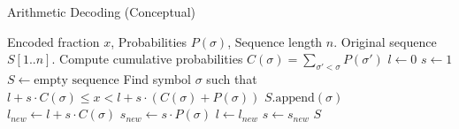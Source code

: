 \begin{algorithm}[hbtp]
    \caption{Arithmetic Decoding (Conceptual)} \label{alg:arithmetic_decoding}
    \begin{algorithmic}[1]
        \Require Encoded fraction $x$, Probabilities $P(\sigma)$, Sequence length $n$.
        \Ensure Original sequence $S[1..n]$.
        \State Compute cumulative probabilities $C(\sigma) = \sum_{\sigma' < \sigma} P(\sigma')$
        \State $l \gets 0$
        \State $s \gets 1$
        \State $S \gets \text{empty sequence}$
        \State Find symbol $\sigma$ such that $l+s \cdot C(\sigma) \le x < l+s \cdot (C(\sigma)+P(\sigma))$
        \State $S.\text{append}(\sigma)$
        \State $l_{new} \gets l + s \cdot C(\sigma)$
        \State $s_{new} \gets s \cdot P(\sigma)$
        \State $l \gets l_{new}$
        \State $s \gets s_{new}$
        \State {}
        \EndFor
        \State \Return $S$
    \end{algorithmic}
\end{algorithm}


